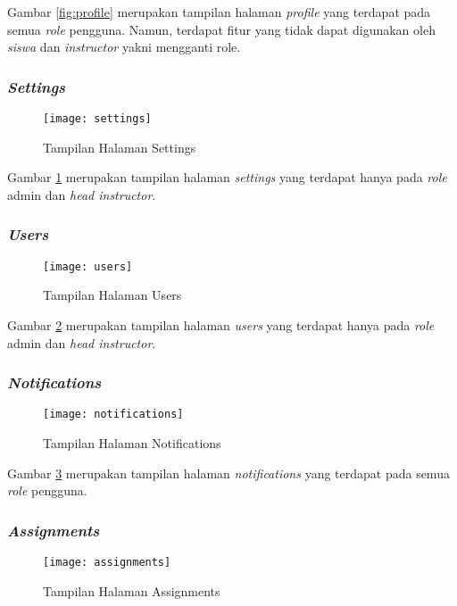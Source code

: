 Gambar \ref{fig:profile} merupakan tampilan halaman \textit{profile} yang terdapat pada semua \textit{role} pengguna. Namun, terdapat fitur yang tidak dapat digunakan oleh \textit{siswa} dan \textit{instructor} yakni mengganti role.

\subsubsection{\textit{Settings}}
\begin{figure}[H]
	\centering  
	\texttt{[image: settings]}  
	\caption[Tampilan Halaman \textit{Settings}]{Tampilan Halaman Settings} 
	\label{fig:settings} 
\end{figure}

Gambar \ref{fig:settings} merupakan tampilan halaman \textit{settings} yang terdapat hanya pada \textit{role} admin dan \textit{head instructor}. 

\subsubsection{\textit{Users}}
\begin{figure}[H]
	\centering  
	\texttt{[image: users]}  
	\caption[Tampilan Halaman \textit{Users}]{Tampilan Halaman Users} 
	\label{fig:users} 
\end{figure}

Gambar \ref{fig:users} merupakan tampilan halaman \textit{users} yang terdapat hanya pada \textit{role} admin dan \textit{head instructor}.

\subsubsection{\textit{Notifications}}
\begin{figure}[H]
	\centering  
	\texttt{[image: notifications]}  
	\caption[Tampilan Halaman \textit{Notifications}]{Tampilan Halaman Notifications} 
	\label{fig:notifications} 
\end{figure}

Gambar \ref{fig:notifications} merupakan tampilan halaman \textit{notifications} yang terdapat pada semua \textit{role} pengguna.

\subsubsection{\textit{Assignments}}
\begin{figure}[H]
	\centering  
	\texttt{[image: assignments]}  
	\caption[Tampilan Halaman \textit{Assignments}]{Tampilan Halaman Assignments} 
	\label{fig:assignments} 
\end{figure}

